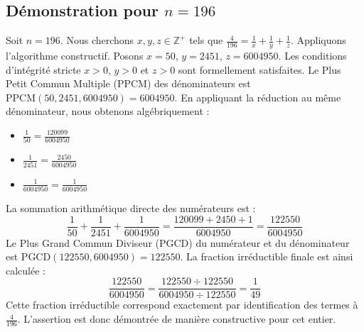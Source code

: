 \documentclass[11pt,a4paper]{article}
\begin{document}
\subsection{Démonstration pour $n = 196$}
Soit $n = 196$. Nous cherchons $x, y, z \in \mathbb{Z}^{+}$ tels que $\frac{4}{196} = \frac{1}{x} + \frac{1}{y} + \frac{1}{z}$.
Appliquons l'algorithme constructif. Posons $x = 50$, $y = 2451$, $z = 6004950$.
Les conditions d'intégrité stricte $x > 0$, $y > 0$ et $z > 0$ sont formellement satisfaites.
Le Plus Petit Commun Multiple (PPCM) des dénominateurs est $\text{PPCM}(50, 2451, 6004950) = 6004950$.
En appliquant la réduction au même dénominateur, nous obtenons algébriquement :
\begin{itemize}
    \item $\frac{1}{50} = \frac{120099}{6004950}$
    \item $\frac{1}{2451} = \frac{2450}{6004950}$
    \item $\frac{1}{6004950} = \frac{1}{6004950}$
\end{itemize}
La sommation arithmétique directe des numérateurs est :
$$ \frac{1}{50} + \frac{1}{2451} + \frac{1}{6004950} = \frac{120099 + 2450 + 1}{6004950} = \frac{122550}{6004950} $$
Le Plus Grand Commun Diviseur (PGCD) du numérateur et du dénominateur est $\text{PGCD}(122550, 6004950) = 122550$.
La fraction irréductible finale est ainsi calculée :
$$ \frac{122550}{6004950} = \frac{122550 \div 122550}{6004950 \div 122550} = \frac{1}{49} $$
Cette fraction irréductible correspond exactement par identification des termes à $\frac{4}{196}$. L'assertion est donc démontrée de manière constructive pour cet entier.
\end{document}
